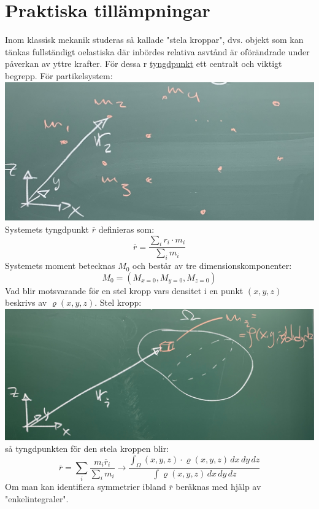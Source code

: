 \section{Praktiska tillämpningar}
Inom klassisk mekanik studeras så kallade "stela kroppar", dvs. objekt som kan tänkas fullständigt oelastiska där inbördes relativa asvtånd är oförändrade under påverkan av yttre krafter.
För dessa r \underline{tyngdpunkt} ett centralt och viktigt begrepp.
För partikelsystem:\\
\includegraphics[scale=0.1]{lessons/lesson20/imgs/img01.jpg}\\
Systemets tyngdpunkt $\overline{r}$ definieras som:
\begin{equation*}
    \overline{r}=\frac{\sum_i r_i\cdot m_i}{\sum_i m_i}
\end{equation*}
Systemets moment betecknas $M_0$ och består av tre dimensionskomponenter:
\begin{equation*}
    M_0=(M_{x=0},M_{y=0},M_{z=0})
\end{equation*}
Vad blir motsvarande för en stel kropp vars densitet i en punkt $(x,y,z)$ beskrivs av $\varrho (x,y,z)$.
Stel kropp:\\
\includegraphics[]{lessons/lesson20/imgs/img02.jpg}\\
så tyngdpunkten för den stela kroppen blir:
\begin{equation*}
    \overline{r}=
    \sum_i \frac{m_i \overline{r}_i}{\sum_i m_i}\to
    \frac{\int_\Omega (x,y,z)\cdot\varrho(x,y,z)\, dx\, dy\, dz}{\int \varrho(x,y,z)\, dx\, dy\, dz}
\end{equation*}
Om man kan identifiera symmetrier ibland $\overline{r}$ beräknas med hjälp av "enkelintegraler".

